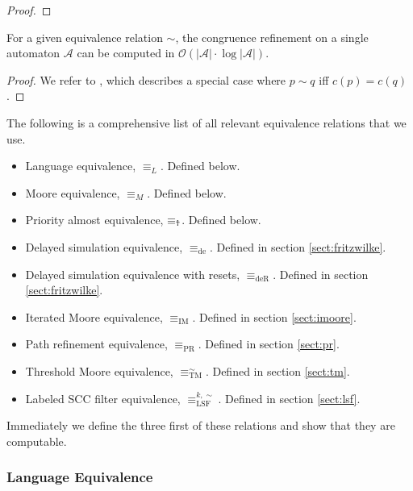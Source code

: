 \begin{proof}
\end{proof}

\begin{lem}
	For a given equivalence relation $\sim$, the congruence refinement on a single automaton $\mathcal{A}$ can be computed in $\mathcal{O}(|\mathcal{A}| \cdot \log |\mathcal{A}|)$.
	\label{lem:general:congref_in_nlogn}
\end{lem}

\begin{proof}
	We refer to \cite{Hopcroft1971}, which describes a special case where $p \sim q$ iff $c(p) = c(q)$.
\end{proof}


\vspace{15pt}
The following is a comprehensive list of all relevant equivalence relations that we use.

\begin{itemize}
	\item Language equivalence, $\equiv_L$. Defined below.
	\item Moore equivalence, $\equiv_M$. Defined below.
	\item Priority almost equivalence, $\equiv_\text{\Ankh}$. Defined below.
	\item Delayed simulation equivalence, $\equiv_\text{de}$. Defined in section \ref{sect:fritzwilke}.
	\item Delayed simulation equivalence with resets, $\equiv_\text{deR}$. Defined in section \ref{sect:fritzwilke}.
	\item Iterated Moore equivalence, $\equiv_\text{IM}$. Defined in section \ref{sect:imoore}.
	\item Path refinement equivalence, $\equiv_\text{PR}$. Defined in section \ref{sect:pr}.
	\item Threshold Moore equivalence, $\equiv_\text{TM}^\sim$. Defined in section \ref{sect:tm}.
	\item Labeled SCC filter equivalence, $\equiv_\text{LSF}^{k,\sim}$. Defined in section \ref{sect:lsf}.
\end{itemize}

Immediately we define the three first of these relations and show that they are computable.

\vspace{5pt}

\subsubsection{Language Equivalence}

